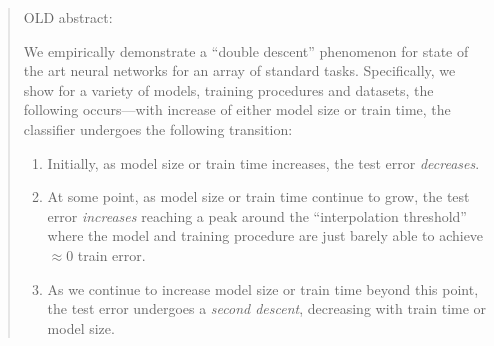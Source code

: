 \begin{abstract}
\fi

\iffalse
OLD abstract:

We empirically demonstrate a ``double descent'' phenomenon for state of the art neural networks for an array of standard tasks.
Specifically, we show for a variety of models, training procedures and datasets, the following occurs---with increase of either model size or train time, the classifier undergoes the following transition:
\begin{enumerate}
    \item Initially, as model size or train time increases, the test error \emph{decreases}.
    \item At some point, as model size or train time continue to grow, the test error \emph{increases} reaching a peak around the ``interpolation threshold'' where the model and training procedure are just barely able to achieve $\approx 0$ train error.
    \item As we continue to increase model size or train time beyond this point, the test error undergoes a \emph{second descent}, decreasing with train time or model size.
\end{enumerate}
 

\end{abstract}
